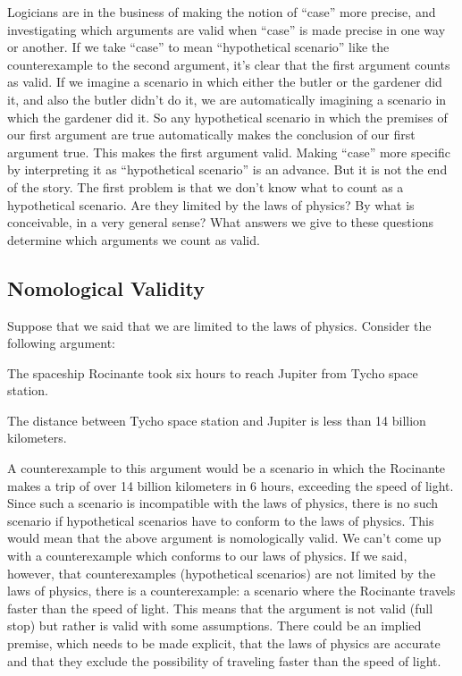 Logicians are in the business of making the notion of “case” more precise, and investigating which arguments are valid when “case” is made precise in one way or another. If we take “case” to mean “hypothetical scenario” like the counterexample to the second argument, it’s clear that the first argument counts as valid. If we imagine a scenario in which either the butler or the gardener did it, and also the butler didn’t do it, we are automatically imagining a scenario in which the gardener did it. So any hypothetical scenario in which the premises of our first argument are true automatically makes the conclusion of our first argument true. This makes the first argument valid.
Making “case” more specific by interpreting it as “hypothetical scenario” is an advance. But it is not the end of the story. The first problem is that we don’t know what to count as a hypothetical scenario. Are they limited by the laws of physics? By what is conceivable, in a very general sense? What answers we give to these questions determine which arguments we count as valid.
\subsection{Nomological Validity}
Suppose that we said that we are limited to the laws of physics. Consider the following argument:
\begin{earg}
\item[]The spaceship Rocinante took six hours to reach Jupiter from Tycho space station.
\item[\therefore] The distance between Tycho space station and Jupiter is less than 14 billion kilometers.
\end{earg}
A counterexample to this argument would be a scenario in which the Rocinante makes a trip of over 14 billion kilometers in 6 hours, exceeding the speed of light. Since such a scenario is incompatible with the laws of physics, there is no such scenario if hypothetical scenarios have to conform to the laws of physics. This would mean that the above argument is nomologically valid. We can't come up with a counterexample which conforms to our laws of physics. If we said, however, that counterexamples (hypothetical scenarios) are not limited by the laws of physics, there is a counterexample: a scenario where the Rocinante travels faster than the speed of light. This means that the argument is not valid (full stop) but rather is valid with some assumptions. There could be an implied premise, which needs to be made explicit, that the laws of physics are accurate and that they exclude the possibility of traveling faster than the speed of light.
